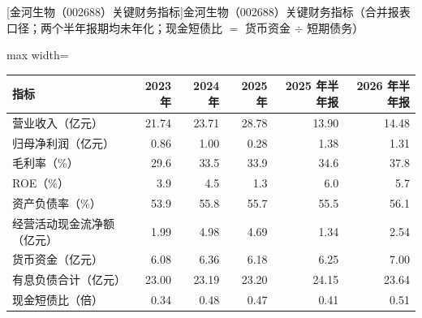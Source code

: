\begin{center}\small\setlength{\tabcolsep}{3.4pt}
[金河生物（002688）关键财务指标]{金河生物（002688）关键财务指标（合并报表口径；两个半年报期均未年化；现金短债比 $=$ 货币资金 $\div$ 短期债务）}
\begin{adjustbox}{max width=\textwidth}
\begin{tabular}{@{}lrrrrr@{}}
\toprule
指标 & 2023 年 & 2024 年 & 2025 年 & 2025 年半年报 & 2026 年半年报 \\
\midrule
营业收入（亿元） & 21.74 & 23.71 & 28.78 & 13.90 & 14.48 \\
归母净利润（亿元） & 0.86 & 1.00 & 0.28 & 1.38 & 1.31 \\
毛利率（\%） & 29.6 & 33.5 & 33.9 & 34.6 & 37.8 \\
ROE（\%） & 3.9 & 4.5 & 1.3 & 6.0 & 5.7 \\
资产负债率（\%） & 53.9 & 55.8 & 55.7 & 55.5 & 56.1 \\
经营活动现金流净额（亿元） & 1.99 & 4.98 & 4.69 & 1.34 & 2.54 \\
货币资金（亿元） & 6.08 & 6.36 & 6.18 & 6.25 & 7.00 \\
有息负债合计（亿元） & 23.00 & 23.19 & 23.20 & 24.15 & 23.64 \\
现金短债比（倍） & 0.34 & 0.48 & 0.47 & 0.41 & 0.51 \\
\bottomrule
\end{tabular}
\end{adjustbox}
\end{center}

